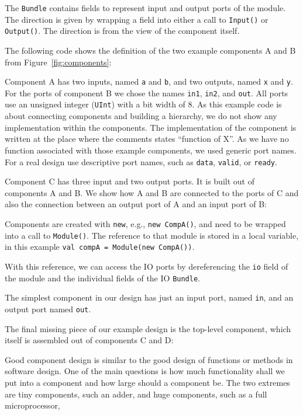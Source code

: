 \documentclass[%
    10pt,
    headinclude, footexclude,
    openright, %
    notitlepage,
    cleardoubleempty,
    headsepline,
    pointlessnumbers,
    bibtotoc, idxtotoc,
    ]{scrbook}
\newcommand{\code}[1]{{\small{\texttt{#1}}}}
\begin{document}
The \code{Bundle} contains fields to represent input and output ports of
the module. The direction is given by wrapping a field into either a call to \code{Input()}
or \code{Output()}. The direction is from the view of the component itself.


The following code shows the definition of the two example components A and B from
Figure~\ref{fig:components}:


\noindent Component A has two inputs, named \code{a} and \code{b}, and two
outputs, named \code{x} and \code{y}. For the ports of component B
we chose the names \code{in1}, \code{in2}, and \code{out}.
All ports use an unsigned integer (\code{UInt}) with a bit width of 8.
As this example code is about connecting components and building a
hierarchy, we do not show any implementation within the components.
The implementation of the component is written at the place where
the comments states ``function of X''.
As we have no function associated with those example components,
we used generic port names. For a real design use descriptive
port names, such as \code{data}, \code{valid}, or \code{ready}.

Component C has three input and two output ports. It is built out of
components A and B. We show how A and B are connected to the ports
of C and also the connection between an output port of A and an
input port of B:


Components are created with \code{new}, e.g., \code{new CompA()}, and need to be wrapped
into a call to \code{Module()}. The reference to that module is stored in a local variable,
in this example \code{val compA = Module(new CompA())}.

With this reference, we can access the IO ports by dereferencing the \code{io} field of the module
and the individual fields of the IO \code{Bundle}.

The simplest component in our design has just an input port, named \code{in}, and
an output port named \code{out}.


The final missing piece of our example design is the top-level component, which itself
is assembled out of components C and D:


Good component design is similar to the good design of functions or methods in
software design. One of the main questions is how much functionality shall we put into
a component and how large should a component be. The two extremes are tiny
components, such an adder, and huge components, such as a full microprocessor,
\end{document}
